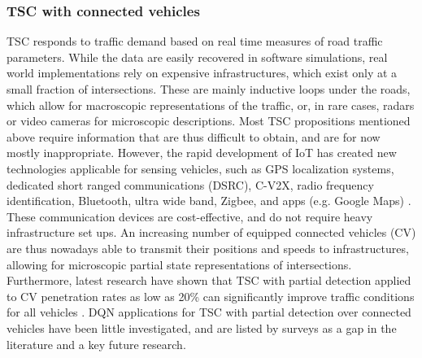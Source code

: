 \documentclass[journal]{IEEEtran}
\begin{document}
\subsubsection{TSC with connected vehicles}

TSC responds to traffic demand based on real time measures of road traffic parameters. While the data are easily recovered in software simulations, real world implementations rely on expensive infrastructures, which exist only at a small fraction of intersections. These are mainly inductive loops under the roads, which allow for macroscopic representations of the traffic, or, in rare cases, radars or video cameras for microscopic descriptions. Most TSC propositions mentioned above require information that are thus difficult to obtain, and are for now mostly inappropriate. However, the rapid  development of IoT has created new technologies applicable for sensing vehicles, such as GPS localization systems, dedicated short ranged communications (DSRC), C-V2X, radio frequency identification, Bluetooth, ultra wide band, Zigbee, and apps (e.g. Google Maps) \cite{nguyen2020estimation,zhang2020using}. These communication devices are cost-effective, and do not require heavy infrastructure set ups. An increasing number of equipped connected vehicles (CV) are thus nowadays able to transmit their positions and speeds to infrastructures, allowing for microscopic partial state representations of intersections. Furthermore, latest research have shown that TSC with partial detection applied to CV penetration rates as low as 20\% can significantly improve traffic conditions for all vehicles \cite{zhang2019partially}. DQN applications for TSC with partial detection over connected vehicles have been little investigated, and are listed by surveys as a gap in the literature and a key future research.
\end{document}
